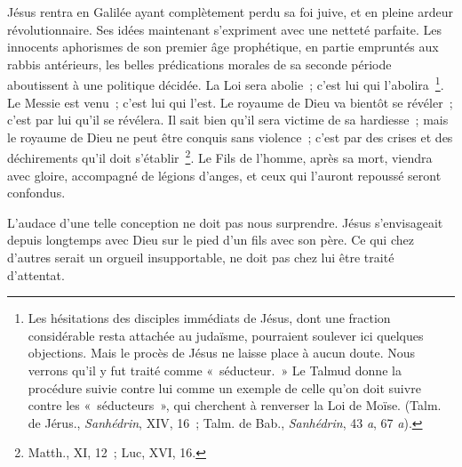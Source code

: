 \documentclass[french,twoside]{book} %
\newcommand\chaptercont{} %
\begin{document}
\chaptercont
\noindent Jésus rentra en Galilée ayant complètement perdu sa foi juive, et en pleine ardeur révolutionnaire. Ses idées maintenant s’expriment avec une netteté parfaite. Les innocents aphorismes de son premier âge prophétique, en partie empruntés aux rabbis antérieurs, les belles prédications morales de sa seconde période aboutissent à une politique décidée. La Loi sera abolie ; c’est lui qui l’abolira \footnote{ Les hésitations des disciples immédiats de Jésus, dont une fraction considérable resta attachée au judaïsme, pourraient soulever ici quelques objections. Mais le procès de Jésus ne laisse place à aucun doute. Nous verrons qu’il y fut traité comme « séducteur. » Le Talmud donne la procédure suivie contre lui comme un exemple de celle qu’on doit suivre contre les « séducteurs », qui cherchent à renverser la Loi de Moïse. (Talm. de Jérus., {\itshape Sanhédrin}, XIV, 16 ; Talm. de Bab., {\itshape Sanhédrin}, 43 {\itshape a}, 67 {\itshape a}).}. Le Messie est venu ; c’est lui qui l’est. Le royaume de Dieu va bientôt se révéler ; c’est par lui qu’il se révélera. Il sait bien qu’il sera victime de sa hardiesse ; mais le royaume de Dieu ne peut être conquis sans violence ; c’est par des crises et des déchirements qu’il doit s’établir \footnote{Matth., XI, 12 ; Luc, XVI, 16.}. Le Fils de l’homme, après sa mort, viendra avec gloire, accompagné de légions d’anges, et ceux qui l’auront repoussé seront confondus.\par
L’audace d’une telle conception ne doit pas nous surprendre. Jésus s’envisageait depuis longtemps avec Dieu sur le pied d’un fils avec son père. Ce qui chez d’autres serait un orgueil insupportable, ne doit pas chez lui être traité d’attentat.\par
\end{document}
